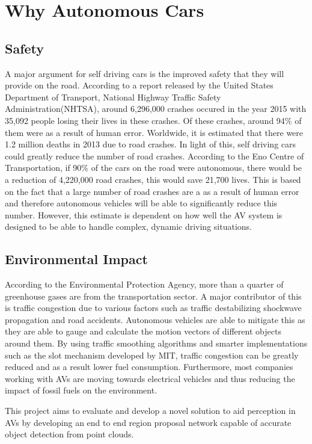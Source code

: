 \section{Why Autonomous Cars}

\subsection{Safety}
A major argument for self driving cars is the improved safety that they will provide on the road. According to a report released by the United States Department of Transport, National Highway Traffic Safety Administration(NHTSA), around 6,296,000 crashes occured in the year 2015 with 35,092 people losing their lives in these crashes. Of these crashes, around 94\% of them were as a result of human error. Worldwide, it is estimated that there were 1.2 million deaths in 2013 due to road crashes. 
In light of this, self driving cars could greatly reduce the number of road crashes. According to the Eno Centre of Transportation, if 90\% of the cars on the road were autonomous, there would be a reduction of 4,220,000 road crashes, this would save 21,700 lives. This is based on the fact that a large number of road crashes are a as a result of human error and therefore autonomous vehicles will be able to significantly reduce this number. 
However, this estimate is dependent on how well the AV system is designed to be able to handle complex, dynamic driving situations. 

\subsection{Environmental Impact}

According to the Environmental Protection Agency, more than a  quarter of greenhouse gases are from the transportation sector. A major contributor of this is traffic congestion due to various factors such as traffic destabilizing shockwave propagation and road accidents. Autonomous vehicles are able to mitigate this as they are able to gauge and calculate the motion vectors of different objects around them. By using traffic smoothing algorithms and smarter implementations such as the slot mechanism developed by MIT, traffic congestion can be greatly reduced and as a result lower fuel consumption. Furthermore, most companies working with AVs are moving towards electrical vehicles and thus reducing the impact of fossil fuels on the environment. 


This project aims to evaluate and develop a novel solution to aid perception in AVs by developing an end to end region proposal network capable of accurate object detection from point clouds. 

